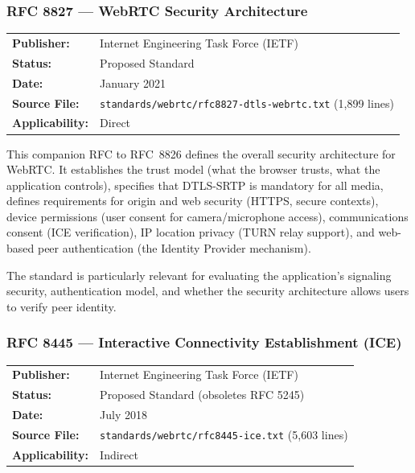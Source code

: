 \documentclass[11pt,letterpaper]{article}
\begin{document}
\subsubsection{RFC 8827 --- WebRTC Security Architecture}
\label{app:rfc8827}

\begin{tabular}{ll}
\textbf{Publisher:} & Internet Engineering Task Force (IETF) \\
\textbf{Status:} & Proposed Standard \\
\textbf{Date:} & January 2021 \\
\textbf{Source File:} & \texttt{standards/webrtc/rfc8827-dtls-webrtc.txt} (1,899 lines) \\
\textbf{Applicability:} & Direct \\
\end{tabular}

\vspace{0.5em}
This companion RFC to RFC~8826 defines the overall security architecture for WebRTC. It establishes the trust model (what the browser trusts, what the application controls), specifies that DTLS-SRTP is mandatory for all media, defines requirements for origin and web security (HTTPS, secure contexts), device permissions (user consent for camera/microphone access), communications consent (ICE verification), IP location privacy (TURN relay support), and web-based peer authentication (the Identity Provider mechanism).

The standard is particularly relevant for evaluating the application's signaling security, authentication model, and whether the security architecture allows users to verify peer identity.

\subsubsection{RFC 8445 --- Interactive Connectivity Establishment (ICE)}
\label{app:rfc8445}

\begin{tabular}{ll}
\textbf{Publisher:} & Internet Engineering Task Force (IETF) \\
\textbf{Status:} & Proposed Standard (obsoletes RFC 5245) \\
\textbf{Date:} & July 2018 \\
\textbf{Source File:} & \texttt{standards/webrtc/rfc8445-ice.txt} (5,603 lines) \\
\textbf{Applicability:} & Indirect \\
\end{tabular}
\end{document}
